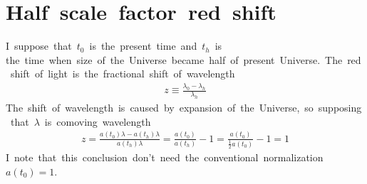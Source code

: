 \section{Half\ scale\ factor\ red\ shift}
I\ suppose\ that\ $t_0$\ is\ the\ present\ time\ and\ $t_h$\ is the\ time\ when\ size\ of\ the\ Universe\ became\ half\ of\ present\ Universe.\ The\ red\ shift\ of\ light\ is\ the\ fractional\ shift\ of\ wavelength
\begin{align*}
    z\equiv\frac{\lambda_0-\lambda_h}{\lambda_h}
\end{align*}
The\ shift\ of\ wavelength\ is\ caused\ by\ expansion\ of\ the\ Universe,\ so\ supposing\ that\ $\lambda$\ is\ comoving\ wavelength
\begin{align}
    z=\frac{a(t_0)\lambda-a(t_h)\lambda}{a(t_h)\lambda}=\frac{a(t_0)}{a(t_h)}-1=\frac{a(t_0)}{\frac{1}{2}a(t_0)}-1=1
\end{align}
I\ note\ that\ this\ conclusion\ don't\ need\ the\ conventional\ normalization\ $a(t_0)=1$.

